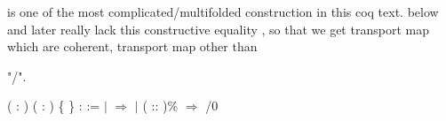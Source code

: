 \coqdocemptyline


  is one of the most complicated/multifolded construction
in this coq text.  below and later really lack this constructive equality ,
so that we get transport map which are coherent, transport map other than  \begin{coqdoccode}
\coqdocemptyline
\coqdocnoindent
{} "/".\coqdoceol
\end{coqdoccode}
\coqdoceol
\coqdocemptyline
\coqdocindent{0.50em}
  ( : ) ( :  ) \{ \} :\coqdoceol
\coqdocindent{1.00em}
 :=\coqdoceol
\coqdocindent{1.00em}
  \coqdoceol
\coqdocindent{1.00em}
\ensuremath{|}  \ensuremath{\Rightarrow} \coqdoceol
\coqdocindent{1.00em}
\ensuremath{|} ( :: )\% \ensuremath{\Rightarrow}    /0  

